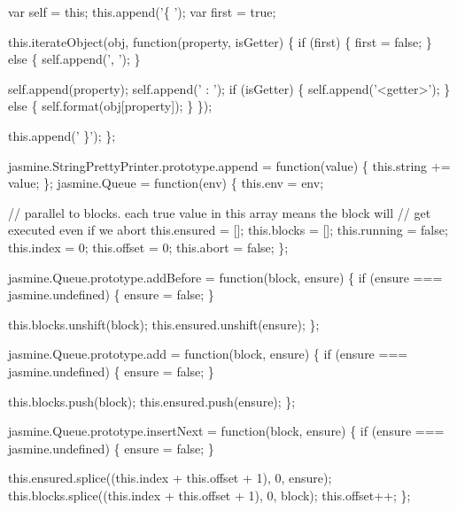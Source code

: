 \begin{DoxyCodeInclude}
  var \textcolor{keyword}{self} = \textcolor{keyword}{this};
  this.append(\textcolor{stringliteral}{'\{ '});
  var first = \textcolor{keyword}{true};

  this.iterateObject(obj, \textcolor{keyword}{function}(property, isGetter) \{
    \textcolor{keywordflow}{if} (first) \{
      first = \textcolor{keyword}{false};
    \} \textcolor{keywordflow}{else} \{
      \textcolor{keyword}{self}.append(\textcolor{stringliteral}{', '});
    \}

    \textcolor{keyword}{self}.append(property);
    \textcolor{keyword}{self}.append(\textcolor{stringliteral}{' : '});
    \textcolor{keywordflow}{if} (isGetter) \{
      \textcolor{keyword}{self}.append(\textcolor{stringliteral}{'<getter>'});
    \} \textcolor{keywordflow}{else} \{
      \textcolor{keyword}{self}.format(obj[property]);
    \}
  \});

  this.append(\textcolor{stringliteral}{' \}'});
\};

jasmine.StringPrettyPrinter.prototype.append = \textcolor{keyword}{function}(value) \{
  this.\textcolor{keywordtype}{string} += value;
\};
jasmine.Queue = \textcolor{keyword}{function}(env) \{
  this.env = env;

  \textcolor{comment}{// parallel to blocks. each true value in this array means the block will}
  \textcolor{comment}{// get executed even if we abort}
  this.ensured = [];
  this.blocks = [];
  this.running = \textcolor{keyword}{false};
  this.index = 0;
  this.offset = 0;
  this.abort = \textcolor{keyword}{false};
\};

jasmine.Queue.prototype.addBefore = \textcolor{keyword}{function}(block, ensure) \{
  \textcolor{keywordflow}{if} (ensure === jasmine.undefined) \{
    ensure = \textcolor{keyword}{false};
  \}

  this.blocks.unshift(block);
  this.ensured.unshift(ensure);
\};

jasmine.Queue.prototype.add = \textcolor{keyword}{function}(block, ensure) \{
  \textcolor{keywordflow}{if} (ensure === jasmine.undefined) \{
    ensure = \textcolor{keyword}{false};
  \}

  this.blocks.push(block);
  this.ensured.push(ensure);
\};

jasmine.Queue.prototype.insertNext = \textcolor{keyword}{function}(block, ensure) \{
  \textcolor{keywordflow}{if} (ensure === jasmine.undefined) \{
    ensure = \textcolor{keyword}{false};
  \}

  this.ensured.splice((this.index + this.offset + 1), 0, ensure);
  this.blocks.splice((this.index + this.offset + 1), 0, block);
  this.offset++;
\};


\end{DoxyCodeInclude}
